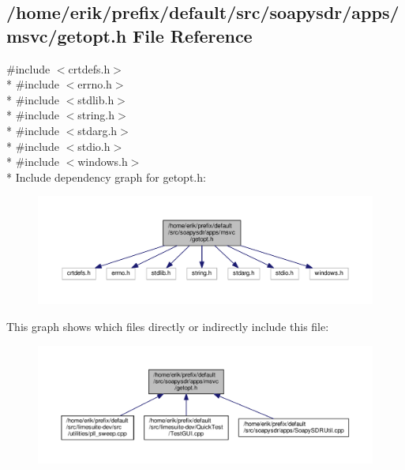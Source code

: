 \subsection{/home/erik/prefix/default/src/soapysdr/apps/msvc/getopt.h File Reference}
\label{soapysdr_2apps_2msvc_2getopt_8h}
{\ttfamily \#include $<$crtdefs.\+h$>$}\\*
{\ttfamily \#include $<$errno.\+h$>$}\\*
{\ttfamily \#include $<$stdlib.\+h$>$}\\*
{\ttfamily \#include $<$string.\+h$>$}\\*
{\ttfamily \#include $<$stdarg.\+h$>$}\\*
{\ttfamily \#include $<$stdio.\+h$>$}\\*
{\ttfamily \#include $<$windows.\+h$>$}\\*
Include dependency graph for getopt.\+h\+:
\nopagebreak
\begin{figure}[H]
\begin{center}
\leavevmode
\includegraphics[width=350pt]{d3/d02/soapysdr_2apps_2msvc_2getopt_8h__incl}
\end{center}
\end{figure}
This graph shows which files directly or indirectly include this file\+:
\nopagebreak
\begin{figure}[H]
\begin{center}
\leavevmode
\includegraphics[width=350pt]{d0/d52/soapysdr_2apps_2msvc_2getopt_8h__dep__incl}
\end{center}
\end{figure}
